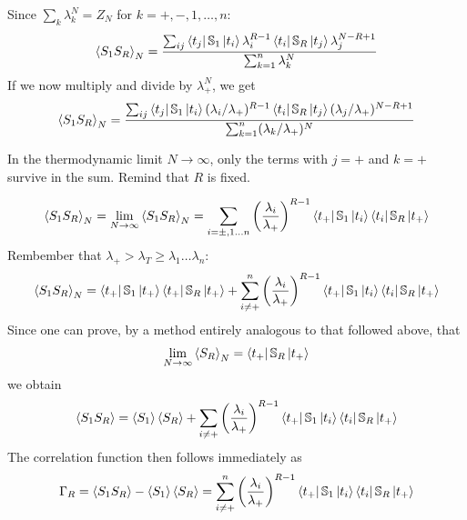 \documentclass[../main/main.tex]{subfiles}
\begin{document}
\noindent Since \( \sum_{k}^{} \lambda _k^N = Z_N \) for \( k=+,-,1,\dots,n \):
\begin{equation}
  \expval{S_1 S_R}_N = \frac{\sum_{ij}^{} \bra{t_j} \mathbb{S}_1 \ket{t_i} \lambda _i^{R-1} \bra{t_i} \mathbb{S}_R \ket{t_j} \lambda _j^{N-R+1}      }{\sum_{k=1}^{n} \lambda _k^N  }
\end{equation}
If we now multiply and divide by \( \lambda _+^N \), we get
\begin{equation}
  \expval{S_1 S_R}_N = \frac{\sum_{ij}^{} \bra{t_j} \mathbb{S}_1 \ket{t_i} (\lambda _i/ \lambda _+)^{R-1}  \bra{t_i} \mathbb{S}_R \ket{t_j} (\lambda _j / \lambda _+)^{N-R+1}    }{\sum_{k=1}^{n} (\lambda _k  / \lambda _+)^{N} }
\end{equation}
\begin{remark}
In the thermodynamic limit \( N \rightarrow \infty  \), only the terms with \( j=+ \) and \( k=+ \) survive in the sum. Remind that \( R \) is fixed.
\end{remark}
\begin{equation}
\expval{S_1 S_R}_N =   \lim_{N \rightarrow \infty } \expval{S_1 S_R}_N = \sum_{i= \pm,1 \dots n}^{} \qty(\frac{\lambda _i}{\lambda _+})^{R-1} \bra{t_+} \mathbb{S}_1 \ket{t_i} \bra{t_i} \mathbb{S}_R \ket{t_+}
\end{equation}
Rembember that \( \lambda _+ > \lambda _T \ge \lambda _1 \dots \lambda _n \):
\begin{equation}
  \expval{S_1 S_R}_N = \bra{t_+} \mathbb{S}_1 \ket{t_+} \bra{t_+} \mathbb{S}_R \ket{t_+} +   \sum_{i \neq +}^{n} \qty(\frac{\lambda _i}{\lambda _+})^{R-1} \bra{t_+} \mathbb{S}_1 \ket{t_i} \bra{t_i} \mathbb{S}_R \ket{t_+}
\end{equation}
Since one can prove, by a method entirely analogous to that followed above, that
\begin{equation}
  \lim_{N \rightarrow \infty } \expval{S_R}_N = \bra{t_+} \mathbb{S}_R \ket{t_+}
\end{equation}
we obtain
\begin{equation}
  \expval{S_1 S_R} = \expval{S_1} \expval{S_R} + \sum_{i \neq +}^{}  \qty(\frac{\lambda _i}{\lambda _+})^{R-1} \bra{t_+} \mathbb{S}_1 \ket{t_i} \bra{t_i} \mathbb{S}_R \ket{t_+}
\end{equation}
The correlation function then follows immediately as
\begin{equation}
\Gamma _R =   \expval{S_1 S_R} - \expval{S_1}\expval{S_R} = \sum_{i \neq +}^{n} \qty(\frac{\lambda _i}{\lambda _+})^{R-1} \bra{t_+} \mathbb{S}_1 \ket{t_i} \bra{t_i} \mathbb{S}_R \ket{t_+}
\end{equation}
\end{document}
